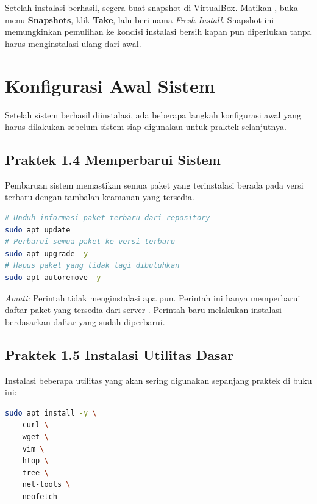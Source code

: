 \begin{tipbox}
Setelah instalasi berhasil, segera buat snapshot di VirtualBox. Matikan ,
buka menu \textbf{Snapshots}, klik \textbf{Take}, lalu beri nama \textit{Fresh Install}.
Snapshot ini memungkinkan pemulihan ke kondisi instalasi bersih kapan pun diperlukan
tanpa harus menginstalasi ulang dari awal.
\end{tipbox}

\section{Konfigurasi Awal Sistem}
\label{sec:post-installation}

Setelah sistem berhasil diinstalasi, ada beberapa langkah konfigurasi awal yang harus
dilakukan sebelum sistem siap digunakan untuk praktek selanjutnya.

\subsection*{Praktek 1.4 Memperbarui Sistem}

Pembaruan sistem memastikan semua paket yang terinstalasi berada pada versi terbaru
dengan tambalan keamanan yang tersedia.

\begin{lstlisting}[language=bash, caption={Memperbarui paket sistem}]
# Unduh informasi paket terbaru dari repository
sudo apt update
# Perbarui semua paket ke versi terbaru
sudo apt upgrade -y
# Hapus paket yang tidak lagi dibutuhkan
sudo apt autoremove -y
\end{lstlisting}

\textit{Amati:} Perintah  tidak menginstalasi apa pun. Perintah ini
hanya memperbarui daftar paket yang tersedia dari server . Perintah
 baru melakukan instalasi berdasarkan daftar yang sudah diperbarui.

\subsection*{Praktek 1.5 Instalasi Utilitas Dasar}

Instalasi beberapa utilitas yang akan sering digunakan sepanjang praktek di buku ini:

\begin{lstlisting}[language=bash, caption={Instalasi utilitas dasar}]
sudo apt install -y \
    curl \
    wget \
    vim \
    htop \
    tree \
    net-tools \
    neofetch
\end{lstlisting}

